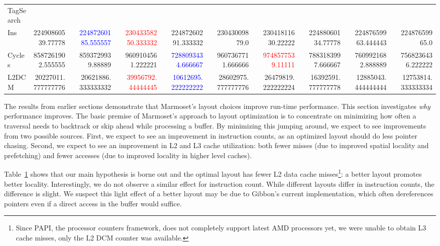 \documentclass[acmsmall,review,anonymous]{acmart}\settopmatter{printfolios=true,printccs=false,printacmref=false}
\newcommand{\system}{{\sc Marmoset}\xspace}
\newcommand{\gibbon}{{\sc Gibbon}\xspace}
\newcommand{\snum}[1]{{\num[round-precision=3,round-mode=figures,scientific-notation=true,output-exponent-marker = e]{#1}}}
\begin{document}
\begin{table}
\begin{tabular}{@{}p{0.6in}rcrcrcrcrcrcrcrcr@{}}
	\\
	Tag\:Search \\
	Ins    & {\snum{22490860539.77778}} &&  \textcolor{blue}{\snum{22487260185.555557}} && \textcolor{red}{\snum{23043358250.333332}}   && {\snum{22487260291.333332}} && {\snum{23043009879.0}} && \snum{23041811630.22222} &&   {\snum{22488060134.77778}} && \snum{22487659963.444443} &&   \snum{22487659965.0}    \\
	Cycles    & {\snum{8587261902.555555}} &&  \snum{8593729939.88889} && {\snum{9609104561.222221}}   && \textcolor{blue}{\snum{7288093434.666667}} && {\snum{9607367711.666666}} && \textcolor{red}{\snum{9748577539.11111}} &&   {\snum{7883183997.666667}} && \snum{7609921682.888889} &&   \snum{7568236436.222222}    \\
	L2\:DCM    & {\snum{20227011.777777776}} &&  \snum{20621886.333333332} &&  \textcolor{red}{\snum{39956792.44444445}}   && \textcolor{blue}{\snum{10612695.222222222}} && {\snum{28602975.777777776}} && \snum{26479819.222222224} &&  {\snum{16392591.777777778}} && \snum{12885043.444444444} &&   \snum{12753814.333333334}    \\
	\bottomrule
	\end{tabular}
	\label{table:filterblogs-papi}
	\end{table}

The results from earlier sections demonstrate that \system's layout choices improve run-time performance. This section investigates {\em why} performance improves. The basic premise of \system's approach to layout optimization is to concentrate on minimizing how often a traversal needs to backtrack or skip ahead while processing a buffer. By minimizing this jumping around, we expect to see improvements from two possible sources. First, we expect to see an improvement in instruction counts, as an optimized layout should do less pointer chasing. Second, we expect to see an improvement in L2 and L3 cache utilization: both fewer misses (due to improved spatial locality and prefetching) and fewer accesses (due to improved locality in higher level caches).

Table~\ref{table:filterblogs-papi} shows that our main hypothesis is borne out and the optimal layout has fewer
L2 data cache misses\footnote{Since PAPI, the processor counters framework, does not completely support latest AMD processors yet, we were unable to obtain L3 cache misses, only the L2 DCM counter was available.}:
a better layout promotes better locality. Interestingly, we do not observe a similar effect for instruction count. While different layouts differ in instruction counts, the difference is slight. We suspect this light effect of a better layout may be due to \gibbon's current implementation, which often dereferences pointers even if a direct access in the buffer would suffice.
\end{document}
